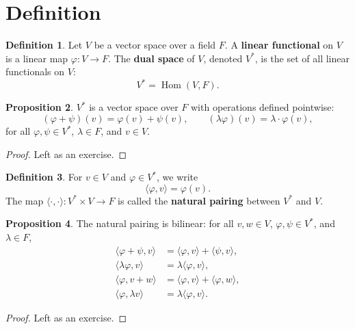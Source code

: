 \documentclass{book}
\theoremstyle{definition}
\newtheorem{definition}{Definition}[section]
\newtheorem{proposition}[definition]{Proposition}
\begin{document}
\section{Definition}

\begin{definition}
Let $V$ be a vector space over a field $F$. A \textbf{linear functional} on $V$ is a linear map $\varphi \colon V \to F$. The \textbf{dual space} of $V$, denoted $V^{*}$, is the set of all linear functionals on $V$:
\[
V^{*} = \operatorname{Hom}(V, F).
\]
\end{definition}

\begin{proposition}
$V^{*}$ is a vector space over $F$ with operations defined pointwise:
\[
(\varphi + \psi)(v) = \varphi(v) + \psi(v), \qquad
(\lambda \varphi)(v) = \lambda \cdot \varphi(v),
\]
for all $\varphi, \psi \in V^{*}$, $\lambda \in F$, and $v \in V$.
\end{proposition}

\begin{proof}
Left as an exercise.
\end{proof}

\begin{definition}
For $v \in V$ and $\varphi \in V^{*}$, we write
\[
\langle \varphi, v \rangle = \varphi(v).
\]
The map $\langle\cdot, \cdot\rangle \colon V^{*} \times V \to F$ is called the \textbf{natural pairing} between $V^{*}$ and $V$.
\end{definition}

\begin{proposition}
The natural pairing is bilinear: for all $v, w \in V$, $\varphi, \psi \in V^{*}$, and $\lambda \in F$,
\[
\begin{aligned}
\langle \varphi + \psi, v \rangle &= \langle \varphi, v \rangle + \langle \psi, v \rangle, \\
\langle \lambda \varphi, v \rangle &= \lambda \langle \varphi, v \rangle, \\
\langle \varphi, v + w \rangle &= \langle \varphi, v \rangle + \langle \varphi, w \rangle, \\
\langle \varphi, \lambda v \rangle &= \lambda \langle \varphi, v \rangle.
\end{aligned}
\]
\end{proposition}

\begin{proof}
Left as an exercise.
\end{proof}
\end{document}
